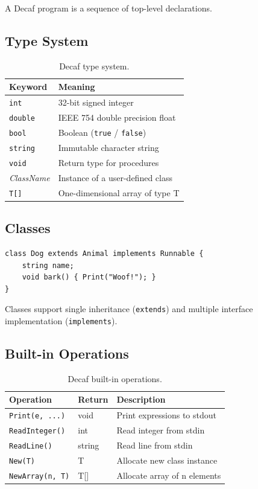 \documentclass[12pt,a4paper]{article}
\begin{document}
A Decaf program is a sequence of top-level declarations.

\subsection{Type System}

\begin{table}[h]
\centering
\begin{tabular}{ll}
\toprule
\textbf{Keyword} & \textbf{Meaning} \\
\midrule
\texttt{int}     & 32-bit signed integer \\
\texttt{double}  & IEEE 754 double precision float \\
\texttt{bool}    & Boolean (\texttt{true} / \texttt{false}) \\
\texttt{string}  & Immutable character string \\
\texttt{void}    & Return type for procedures \\
\textit{ClassName} & Instance of a user-defined class \\
\texttt{T[]}     & One-dimensional array of type T \\
\bottomrule
\end{tabular}
\caption{Decaf type system.}
\end{table}

\subsection{Classes}

\begin{lstlisting}[style=decaf]
class Dog extends Animal implements Runnable {
    string name;
    void bark() { Print("Woof!"); }
}
\end{lstlisting}

Classes support single inheritance (\texttt{extends}) and multiple interface
implementation (\texttt{implements}).

\subsection{Built-in Operations}

\begin{table}[h]
\centering
\begin{tabular}{lll}
\toprule
\textbf{Operation} & \textbf{Return} & \textbf{Description} \\
\midrule
\texttt{Print(e, ...)}      & void    & Print expressions to stdout \\
\texttt{ReadInteger()}      & int     & Read integer from stdin \\
\texttt{ReadLine()}         & string  & Read line from stdin \\
\texttt{New(T)}             & T       & Allocate new class instance \\
\texttt{NewArray(n, T)}     & T[]     & Allocate array of n elements \\
\bottomrule
\end{tabular}
\caption{Decaf built-in operations.}
\end{table}
\end{document}
